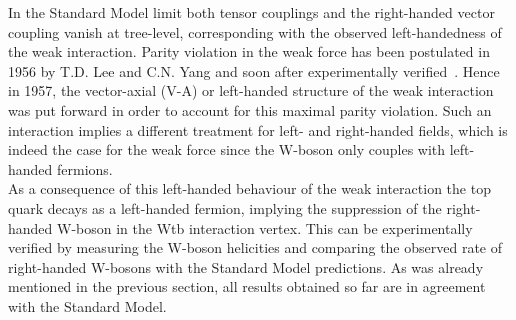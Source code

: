 In the Standard Model limit both tensor couplings and the right-handed vector coupling vanish at tree-level, corresponding with the observed left-handedness of the weak interaction.
Parity violation in the weak force has been postulated in 1956 by T.D. Lee and C.N. Yang and soon after experimentally verified~\cite{PViolationLeeYang, PViolationWu}. Hence in 1957, the vector-axial (V-A) or left-handed structure of the weak interaction was put forward in order to account for this maximal parity violation. Such an interaction implies a different treatment for left- and right-handed fields, which is indeed the case for the weak force since the W-boson only couples with left-handed fermions.
\\
As a consequence of this left-handed behaviour of the weak interaction the top quark decays as a left-handed fermion, implying the suppression of the right-handed W-boson in the Wtb interaction vertex.
This can be experimentally verified by measuring the W-boson helicities and comparing the observed rate of right-handed W-bosons with the Standard Model predictions. As was already mentioned in the previous section, all results obtained so far are in agreement with the Standard Model.
\\


